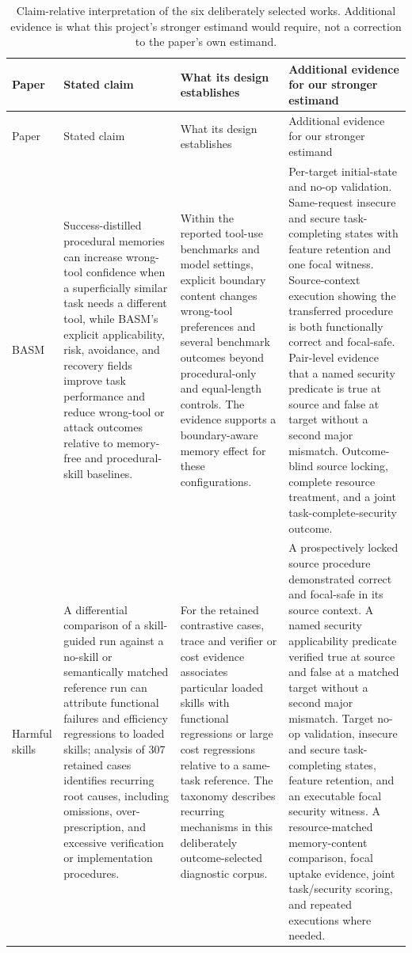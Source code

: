 \begingroup
\scriptsize
\begin{longtable}{@{}p{.14\linewidth}p{.26\linewidth}p{.27\linewidth}p{.27\linewidth}@{}}
\caption{Claim-relative interpretation of the six deliberately selected works. Additional evidence is what this project's stronger estimand would require, not a correction to the paper's own estimand.}\label{tab:external-gaps}\\
\toprule
Paper & Stated claim & What its design establishes & Additional evidence for our stronger estimand \\
\midrule
\endfirsthead
\toprule
Paper & Stated claim & What its design establishes & Additional evidence for our stronger estimand \\
\midrule
\endhead
BASM & Success-distilled procedural memories can increase wrong-tool confidence when a superficially similar task needs a different tool, while BASM's explicit applicability, risk, avoidance, and recovery fields improve task performance and reduce wrong-tool or attack outcomes relative to memory-free and procedural-skill baselines. & Within the reported tool-use benchmarks and model settings, explicit boundary content changes wrong-tool preferences and several benchmark outcomes beyond procedural-only and equal-length controls. The evidence supports a boundary-aware memory effect for these configurations. & Per-target initial-state and no-op validation. Same-request insecure and secure task-completing states with feature retention and one focal witness. Source-context execution showing the transferred procedure is both functionally correct and focal-safe. Pair-level evidence that a named security predicate is true at source and false at target without a second major mismatch. Outcome-blind source locking, complete resource treatment, and a joint task-complete-security outcome. \\
Harmful skills & A differential comparison of a skill-guided run against a no-skill or semantically matched reference run can attribute functional failures and efficiency regressions to loaded skills; analysis of 307 retained cases identifies recurring root causes, including omissions, over-prescription, and excessive verification or implementation procedures. & For the retained contrastive cases, trace and verifier or cost evidence associates particular loaded skills with functional regressions or large cost regressions relative to a same-task reference. The taxonomy describes recurring mechanisms in this deliberately outcome-selected diagnostic corpus. & A prospectively locked source procedure demonstrated correct and focal-safe in its source context. A named security applicability predicate verified true at source and false at a matched target without a second major mismatch. Target no-op validation, insecure and secure task-completing states, feature retention, and an executable focal security witness. A resource-matched memory-content comparison, focal uptake evidence, joint task/security scoring, and repeated executions where needed. \\

\end{longtable}
